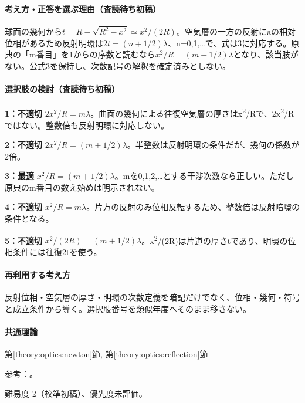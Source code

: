\paragraph{考え方・正答を選ぶ理由（査読待ち初稿）} 球面の幾何から\(t=R-\sqrt{R^2-x^2}\simeq x^2/(2R)\)。空気層の一方の反射にπの相対位相があるため反射明環は\(2t=(n+1/2)\lambda\)、n=\allowbreak{}0,1,…で、式は3に対応する。原典の「m番目」を1からの序数と読むなら\(x^2/R=(m-1/2)\lambda\)となり、該当肢がない。公式3を保持し、次数記号の解釈を確定済みとしない。

\paragraph{選択肢の検討（査読待ち初稿）}\mbox{}\par

\noindent\textbf{1：不適切} \(2x^2/R=m\lambda\)。曲面の幾何による往復空気層の厚さはx\textsuperscript{2}/Rで、2x\textsuperscript{2}/Rではない。整数倍も反射明環に対応しない。\par

\noindent\textbf{2：不適切} \(2x^2/R=(m+1/2)\lambda\)。半整数は反射明環の条件だが、幾何の係数が2倍。\par

\noindent\textbf{3：最適} \(x^2/R=(m+1/2)\lambda\)。mを0,1,2,…とする干渉次数なら正しい。ただし原典のm番目の数え始めは明示されない。\par

\noindent\textbf{4：不適切} \(x^2/R=m\lambda\)。片方の反射のみ位相反転するため、整数倍は反射暗環の条件となる。\par

\noindent\textbf{5：不適切} \(x^2/(2R)=(m+1/2)\lambda\)。x\textsuperscript{2}/(2R)は片道の厚さtであり、明環の位相条件には往復2tを使う。\par

\paragraph{再利用する考え方} 反射位相・空気層の厚さ・明環の次数定義を暗記だけでなく、位相・幾何・符号と成立条件から導く。選択肢番号を類似年度へそのまま移さない。

\paragraph{共通理論} \hyperref[theory:optics:newton]{第\ref*{theory:optics:newton}節}, \hyperref[theory:optics:reflection]{第\ref*{theory:optics:reflection}節}

\par 参考：\cite{os_thinfilm}。

\par 難易度 2（校準初稿）、優先度未評価。
